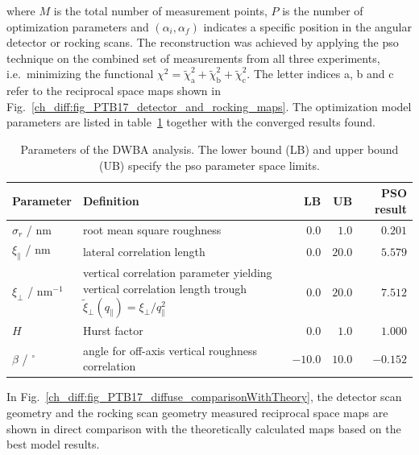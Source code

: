 where $M$ is the total number of measurement points, $P$ is the number of optimization parameters and $(\alpha_i, \alpha_f)$ indicates a specific position in the angular detector or rocking scans. The reconstruction was achieved by applying the \gls{pso} technique on the combined set of measurements from all three experiments, i.e.~minimizing the functional $\chi^2 = \tilde{\chi}^2_\text{a} + \tilde{\chi}^2_\text{b} + \tilde{\chi}^2_\text{c}$. The letter indices a, b and c refer to the reciprocal space maps shown in Fig.~\ref{ch_diff:fig_PTB17_detector_and_rocking_maps}. The optimization model parameters are listed in table~\ref{ch_diff:tbl_PTB17_diffuse_optimization_limits_and_results} together with the converged results found.
\begin{table}
\centering
\caption{Parameters of the DWBA analysis. The lower bound (LB) and upper bound (UB) specify the \gls{pso} parameter space limits.}
\label{ch_diff:tbl_PTB17_diffuse_optimization_limits_and_results}
\begin{tabularx}{\textwidth}{@{}lXrrr@{}}
\toprule
Parameter & Definition & LB & UB & PSO result\\ \midrule
$\sigma_r$ / nm & root mean square roughness & $0.0$& $1.0$ & $0.201$\\ 
$\xi_\parallel$ / nm & lateral correlation length & $0.0$& $20.0$ & $5.579$\\ 
$\xi_\perp$ / nm$^{-1}$ &vertical correlation parameter yielding vertical correlation length trough $\tilde{\xi}_\perp(q_\parallel) = \xi_\perp/q_\parallel^2$ &$0.0$ & $20.0$ & $7.512$\\
$H$ & Hurst factor & $0.0$ & $1.0$ & $1.000$ \\
$\beta$ / $^\circ$&angle for off-axis vertical roughness correlation& $-10.0$ & $10.0$ & $-0.152$\\ 
 \bottomrule
\end{tabularx}
\end{table}
In Fig.~\ref{ch_diff:fig_PTB17_diffuse_comparisonWithTheory}, the detector scan geometry and the rocking scan geometry measured reciprocal space maps are shown in direct comparison with the theoretically calculated maps based on the best model results. 
